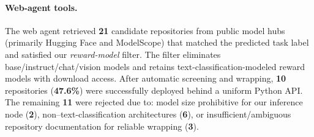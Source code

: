 \paragraph{Web-agent tools.}
The web agent retrieved \textbf{21} candidate repositories from public model hubs (primarily Hugging Face and ModelScope) that matched the predicted task label and satisfied our \emph{reward-model} filter. The filter eliminates base/instruct/chat/vision models and retains text-classification-modeled reward models with download access.
After automatic screening and wrapping, \textbf{10} repositories (\textbf{47.6\%}) were successfully deployed behind a uniform Python API. The remaining \textbf{11} were rejected due to: model size prohibitive for our inference node (\textbf{2}), non–text-classification architectures (\textbf{6}), or insufficient/ambiguous repository documentation for reliable wrapping (\textbf{3}).






